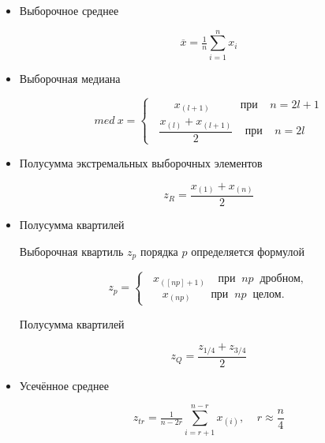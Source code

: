 \documentclass[a4paper,14pt]{article}
\begin{document}
	\begin{itemize}
		\item Выборочное среднее
		
		\begin{equation} \label{eq:mean}
			\overline{x} = \tfrac{1}{n}\sum\limits_{i=1}^n x_i
		\end{equation}
		
		\item Выборочная медиана
		
		\begin{equation} \label{eq:med}
			med \: x = 
			\begin{cases} 
				\;\;\;\;\;\;\; x_{(l+1)} \:\;\;\;\;\;\;\;\;\; \text{при} \;\;\;\; n = 2l + 1\\
				\;\; \dfrac{x_{(l)} + x_{(l+1)}}{2} \;\;\;\; \text{при} \;\;\;\; n = 2l
			\end{cases}
		\end{equation}
		
		\item Полусумма экстремальных выборочных элементов
		
		\begin{equation} \label{eq:zR}
			z_R = \dfrac{x_{(1)} + x_{(n)}}{2}
		\end{equation}
		
		\item Полусумма квартилей
		
		Выборочная квартиль $z_p$ порядка $p$ определяется формулой
		
		\begin{equation}
			z_p =
			\begin{cases}
				\;\; x_{([np]+1)} \;\;\;\; \text{при} \;\; np \;\; \text{дробном},\\
				\;\;\;\;\; x_{(np)} \,\:\;\;\;\;\; \text{при} \;\; np \;\; \text{целом}.
			\end{cases}
		\end{equation}
		
		Полусумма квартилей
		
		\begin{equation} \label{eq:zQ}
			z_Q = \dfrac{z_{1/4} + z_{3/4}}{2}
		\end{equation}
		
		\item Усечённое среднее
		
		\begin{equation} \label{eq:zTr}
			z_{tr} = \tfrac{1}{n-2r}\sum\limits_{i=r+1}^{n-r} x_{(i)}, \;\;\;\; r \approx \dfrac{n}{4}
		\end{equation}
		
	\end{itemize}
	
\end{document}
